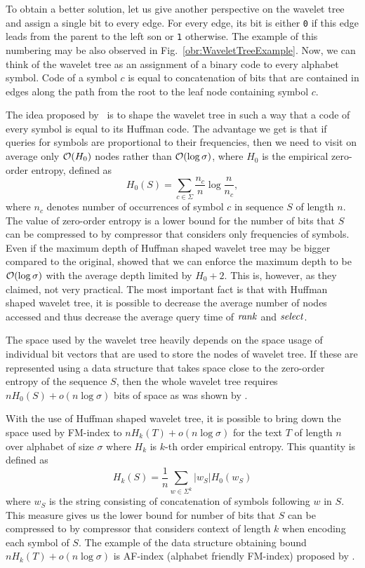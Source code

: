 To obtain a better solution, let us give another perspective on the wavelet tree and assign
a single bit to every edge. For every edge, its bit is either {\tt 0} if this edge leads from
the parent to the left son or {\tt 1} otherwise. The example of this numbering may be also
observed in Fig.~\ref{obr:WaveletTreeExample}. Now, we can think of the wavelet tree as an
assignment of a binary code to every alphabet symbol. Code of a symbol $c$ is equal to
concatenation of bits that are contained in edges along the path from the root to the leaf node
containing symbol $c$.

The idea proposed by~\cite{makinen2005succinct} is to shape the wavelet tree in such a way that
a code of every symbol is equal to its Huffman code. The advantage we get is that if queries for
symbols are proportional to their frequencies, then we need to visit on average
only $\mathcal{O}(H_0)$ nodes rather than $\mathcal{O}(\log \sigma)$, where $H_0$ is the empirical zero-order
entropy, defined as $$H_0(S)=\sum_{c\in\Sigma} \frac{n_c}{n} \log \frac{n}{n_c},$$
where $n_c$ denotes number of occurrences of symbol $c$ in sequence $S$ of length $n$. The value
of zero-order entropy is a lower bound for the number of bits that $S$ can be compressed to by
compressor that considers only frequencies of symbols. Even if the maximum depth of Huffman
shaped wavelet tree may be bigger compared to the original, \cite{grabowski2004first} showed
that we can enforce the maximum depth to be $\mathcal{O}(\log \sigma)$ with the average depth limited
by $H_0+2$. This is, however, as they claimed, not very practical. The most important fact is
that with Huffman shaped wavelet tree, it is possible to decrease the average number of nodes
accessed and thus decrease the average query time of $\mathit{rank}$ and $\mathit{select}$.

The space used by the wavelet tree heavily depends on the space usage of individual bit vectors
that are used to store the nodes of wavelet tree. If these are represented using a data structure
that takes space close to the zero-order entropy of the sequence $S$, then the whole wavelet tree
requires $nH_0(S) + o(n\log\sigma)$ bits of space as was shown by \cite{grossi2003high}.

With the use of Huffman shaped wavelet tree, it is possible to bring down the space used by FM-index to
$nH_k(T)+o(n\log \sigma)$ for the text $T$ of length $n$ over alphabet of size $\sigma$ where $H_k$ is
$k$-th order empirical entropy. This quantity is defined as
$$H_k(S) = \frac{1}{n} \sum_{w\in \Sigma^k} |w_S| H_0(w_S)$$ where $w_S$ is the string consisting of
concatenation of symbols following $w$ in $S$. This measure gives us the lower bound for number of bits
that $S$ can be compressed to by compressor that considers context of length $k$ when encoding each
symbol of $S$. The example of the data structure obtaining bound $nH_k(T)+o(n\log \sigma)$ is AF-index
(alphabet friendly FM-index) proposed by \cite{ferragina2004alphabet}.

